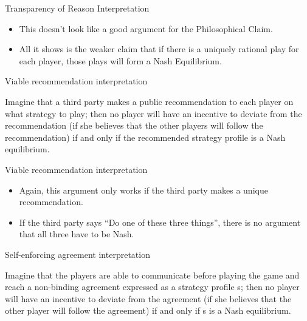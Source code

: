 \documentclass[
  ignorenonframetext,
]{beamer}
\providecommand{\tightlist}{%
  \setlength{\itemsep}{0pt}\setlength{\parskip}{0pt}}
\renewenvironment*{quote}	
	{\list{}{\rightmargin   \leftmargin} \item } 	
	{\endlist }
\begin{document}
\begin{frame}{Transparency of Reason Interpretation}
\protect\hypertarget{transparency-of-reason-interpretation-1}{}
\begin{itemize}
\tightlist
\item
  This doesn't look like a good argument for the Philosophical Claim.
\item
  All it shows is the weaker claim that if there is a uniquely rational
  play for each player, those plays will form a Nash Equilibrium.
\end{itemize}
\end{frame}

\begin{frame}{Viable recommendation interpretation}
\protect\hypertarget{viable-recommendation-interpretation}{}
\begin{quote}
Imagine that a third party makes a public recommendation to each player
on what strategy to play; then no player will have an incentive to
deviate from the recommendation (if she believes that the other players
will follow the recommendation) if and only if the recommended strategy
profile is a Nash equilibrium.
\end{quote}
\end{frame}

\begin{frame}{Viable recommendation interpretation}
\protect\hypertarget{viable-recommendation-interpretation-1}{}
\begin{itemize}
\tightlist
\item
  Again, this argument only works if the third party makes a unique
  recommendation.
\item
  If the third party says ``Do one of these three things'', there is no
  argument that all three have to be Nash.
\end{itemize}
\end{frame}

\begin{frame}{Self-enforcing agreement interpretation}
\protect\hypertarget{self-enforcing-agreement-interpretation}{}
\begin{quote}
Imagine that the players are able to communicate before playing the game
and reach a non-binding agreement expressed as a strategy profile s;
then no player will have an incentive to deviate from the agreement (if
she believes that the other player will follow the agreement) if and
only if s is a Nash equilibrium.
\end{quote}
\end{frame}
\end{document}
